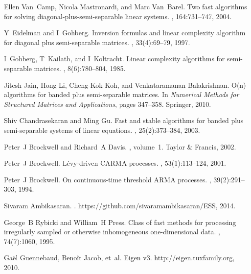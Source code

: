 \documentclass[final,leqno]{siamltex}
\begin{document}
\begin{thebibliography}{10}
Ellen Van~Camp, Nicola Mastronardi, and Marc Van~Barel.
\newblock Two fast algorithms for solving diagonal-plus-semi-separable linear
  systems.
, 164:731--747,
  2004.

Y~Eidelman and I~Gohberg.
\newblock Inversion formulas and linear complexity algorithm for diagonal plus
  semi-separable matrices.
, 33(4):69--79, 1997.

I~Gohberg, T~Kailath, and I~Koltracht.
\newblock Linear complexity algorithms for semi-separable matrices.
, 8(6):780--804, 1985.

Jitesh Jain, Hong Li, Cheng-Kok Koh, and Venkataramanan Balakrishnan.
\newblock O(n) algorithms for banded plus semi-separable matrices.
\newblock In {\em Numerical Methods for Structured Matrices and Applications},
  pages 347--358. Springer, 2010.

Shiv Chandrasekaran and Ming Gu.
\newblock Fast and stable algorithms for banded plus semi-separable systems of
  linear equations.
,
  25(2):373--384, 2003.

Peter~J Brockwell and Richard~A Davis.
, volume~1.
\newblock Taylor \& Francis, 2002.

Peter~J Brockwell.
\newblock L{\'e}vy-driven {CARMA} processes.
,
  53(1):113--124, 2001.

Peter~J Brockwell.
\newblock On continuous-time threshold {ARMA} processes.
, 39(2):291--303,
  1994.

Sivaram Ambikasaran.
.
\newblock https://github.com/sivaramambikasaran/ESS, 2014.

George~B Rybicki and William~H Press.
\newblock Class of fast methods for processing irregularly sampled or otherwise
  inhomogeneous one-dimensional data.
, 74(7):1060, 1995.

Ga\"{e}l Guennebaud, Beno\^{i}t Jacob, et~al.
\newblock Eigen v3.
\newblock http://eigen.tuxfamily.org, 2010.

\end{thebibliography}
\end{document}
